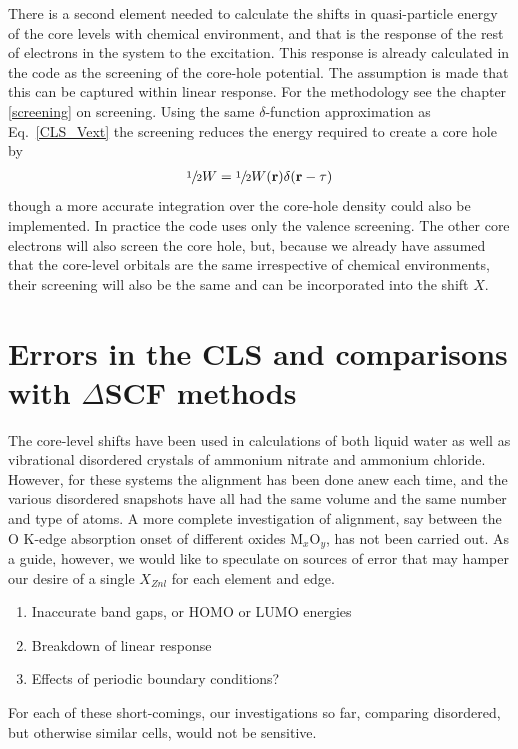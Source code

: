 \documentclass[11pt]{report}
\begin{document}
There is a second element needed to calculate the shifts in quasi-particle energy of the core levels with chemical environment, and that is the response of the rest of electrons in the system to the excitation. 
This response is already calculated in the code as the screening of the core-hole potential.
The assumption is made that this can be captured within linear response. For the methodology see the chapter \ref{screening} on screening.
Using the same $\delta$-function approximation as Eq.~\ref{CLS_Vext} the screening reduces the energy required to create a core hole by
\begin{align}
\sfrac{1}{2} W = \sfrac{1}{2} W(\mathbf{r}) \delta(\mathbf{r} - \mathbf{\tau}) 
\end{align}
though a more accurate integration over the core-hole density could also be implemented. 
In practice the code uses only the valence screening. The other core electrons will also screen the core hole, but, because we already have assumed that the core-level orbitals are the same irrespective of chemical environments, their screening will also be the same and can be incorporated into the shift $X$.

\section{Errors in the CLS and comparisons with $\Delta$SCF methods}

The core-level shifts have been used in  calculations of both liquid water as well as vibrational disordered crystals of ammonium nitrate and ammonium chloride. 
However, for these systems the alignment has been done anew each time, and the various disordered snapshots have all had the same volume and the same number and type of atoms.
A more complete investigation of alignment, say between the O K-edge absorption onset of different oxides M$_x$O$_y$, has not been carried out.
As a guide, however, we would like to speculate on sources of error that may hamper our desire of a single $X_{Znl}$ for each element and edge.
\begin{enumerate}
\item{Inaccurate band gaps, or HOMO or LUMO energies}
\item{Breakdown of linear response}
\item{Effects of periodic boundary conditions?}
\end{enumerate}
For each of these short-comings, our investigations so far, comparing disordered, but otherwise similar cells, would not be sensitive.
\end{document}
